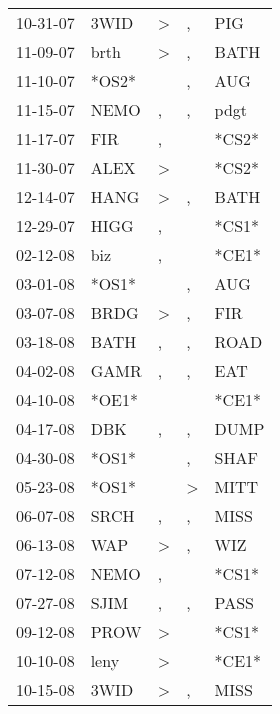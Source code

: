 \begin{supertabular}{lllll}
 10-31-07 &   3WID &     \textgreater &                , &    PIG \\
 11-09-07 &   brth &     \textgreater &                , &   BATH \\
 11-10-07 &  *OS2* &                  &                , &    AUG \\
 11-15-07 &   NEMO &                , &                , &   pdgt \\
 11-17-07 &    FIR &                , &                  &  *CS2* \\
 11-30-07 &   ALEX &     \textgreater &                  &  *CS2* \\
 12-14-07 &   HANG &     \textgreater &                , &   BATH \\
 12-29-07 &   HIGG &                , &                  &  *CS1* \\
 02-12-08 &    biz &                , &                  &  *CE1* \\
 03-01-08 &  *OS1* &                  &                , &    AUG \\
 03-07-08 &   BRDG &     \textgreater &                , &    FIR \\
 03-18-08 &   BATH &                , &                , &   ROAD \\
 04-02-08 &   GAMR &                , &                , &    EAT \\
 04-10-08 &  *OE1* &                  &                  &  *CE1* \\
 04-17-08 &    DBK &                , &                , &   DUMP \\
 04-30-08 &  *OS1* &                  &                , &   SHAF \\
 05-23-08 &  *OS1* &                  &     \textgreater &   MITT \\
 06-07-08 &   SRCH &                , &                , &   MISS \\
 06-13-08 &    WAP &     \textgreater &                , &    WIZ \\
 07-12-08 &   NEMO &                , &                  &  *CS1* \\
 07-27-08 &   SJIM &                , &                , &   PASS \\
 09-12-08 &   PROW &     \textgreater &                  &  *CS1* \\
 10-10-08 &   leny &     \textgreater &                  &  *CE1* \\
 10-15-08 &   3WID &     \textgreater &                , &   MISS \\

\end{supertabular}
